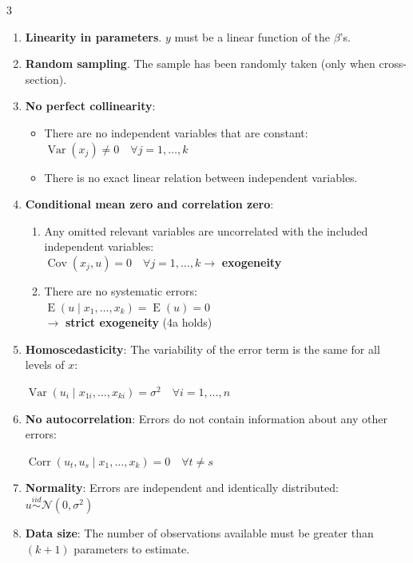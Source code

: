 \documentclass[10pt, a4paper, landscape]{article}
\DeclareMathOperator{\E}{E}
\DeclareMathOperator{\Var}{Var}
\DeclareMathOperator{\Cov}{Cov}
\DeclareMathOperator{\Corr}{Corr}
\begin{document}
\begin{multicols}{3}
\begin{enumerate}[leftmargin=*]
	\item \textbf{Linearity in parameters}. \( y \) must be a linear function of the \( \beta \)'s.
	\item \textbf{Random sampling}. The sample has been randomly taken (only when cross-section).
	\item \textbf{No perfect collinearity}:
	\begin{itemize}[leftmargin=*]
		\item There are no independent variables that are constant: \( \Var(x_{j}) \neq 0 \quad \forall j = 1, \ldots, k \)
		\item There is no exact linear relation between independent variables.
	\end{itemize}
	\item \textbf{Conditional mean zero and correlation zero}:
	\begin{enumerate}[leftmargin=*, label=\alph{*}.]
		\item Any omitted relevant variables are uncorrelated with the included independent variables: \\
		\( \Cov(x_{j}, u) = 0 \quad \forall j = 1, \ldots, k \rightarrow \) \textbf{exogeneity}
		\item There are no systematic errors: \\
		\( \E(u \mid x_{1}, \ldots, x_{k}) = \E(u) = 0 \) \\
		\( \rightarrow \) \textbf{strict exogeneity} (4a holds)
	\end{enumerate}
	\item \textbf{Homoscedasticity}: The variability of the error term is the same for all levels of \( x \):
	\begin{center}
		\( \Var(u_{i} \mid x_{1i}, \ldots, x_{ki}) = \sigma^{2} \quad \forall i = 1, \ldots, n \)
	\end{center}
	\item \textbf{No autocorrelation}: Errors do not contain information about any other errors:
	\begin{center}
		\( \Corr(u_{t}, u_{s} \mid x_{1}, \ldots, x_{k}) = 0 \quad \forall t \neq s \)
	\end{center}
	\item \textbf{Normality}: Errors are independent and identically distributed: \( u \overset{iid}{\sim} \mathcal{N} (0, \sigma^{2}) \)
	\item \textbf{Data size}: The number of observations available must be greater than \( (k + 1) \) parameters to estimate.
\end{enumerate}


\end{multicols}
\end{document}
